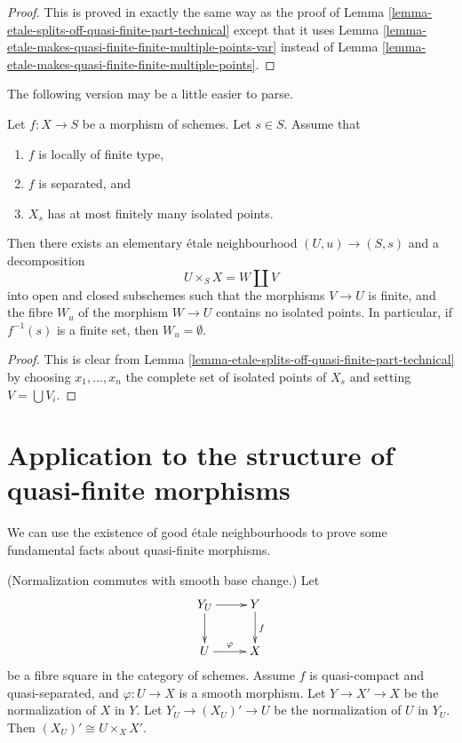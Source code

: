 \begin{proof}
This is proved in exactly the same way as the proof of
Lemma \ref{lemma-etale-splits-off-quasi-finite-part-technical} except that it
uses Lemma \ref{lemma-etale-makes-quasi-finite-finite-multiple-points-var}
instead of Lemma \ref{lemma-etale-makes-quasi-finite-finite-multiple-points}.
\end{proof}

\noindent
The following version may be a little easier to parse.

\begin{lemma}
\label{lemma-etale-splits-off-quasi-finite-part}
Let $f : X \to S$ be a morphism of schemes.
Let $s \in S$. Assume that
\begin{enumerate}
\item $f$ is locally of finite type,
\item $f$ is separated, and
\item $X_s$ has at most finitely many isolated points.
\end{enumerate}
Then there exists an elementary \'etale neighbourhood $(U, u) \to (S, s)$
and a decomposition
$$
U \times_S X = W \coprod V
$$
into open and closed subschemes such that the morphisms
$V \to U$ is finite, and the fibre $W_u$ of the
morphism $W \to U$ contains no isolated points.
In particular, if $f^{-1}(s)$ is a finite set, then $W_u = \emptyset$.
\end{lemma}

\begin{proof}
This is clear from
Lemma \ref{lemma-etale-splits-off-quasi-finite-part-technical}
by choosing $x_1, \ldots, x_n$ the complete set of
isolated points of $X_s$ and setting $V = \bigcup V_i$.
\end{proof}







\section{Application to the structure of quasi-finite morphisms}
\label{section-application-etale-neighbourhoods}

\noindent
We can use the existence of good \'etale neighbourhoods to prove
some fundamental facts about quasi-finite morphisms.

\begin{lemma}
\label{lemma-normalization-smooth-localization}
(Normalization commutes with smooth base change.) Let
$$
\xymatrix{
Y_U \ar[r] \ar[d] & Y \ar[d]^f \\
U \ar[r]^\varphi & X
}
$$
be a fibre square in the category of schemes.
Assume $f$ is quasi-compact and quasi-separated,
and $\varphi : U \to X$ is a smooth morphism.
Let $Y \to X' \to X$ be the normalization of $X$ in $Y$.
Let $Y_U \to (X_U)' \to U$ be the normalization of $U$ in $Y_U$.
Then $(X_U)' \cong U \times_X X'$.
\end{lemma}

